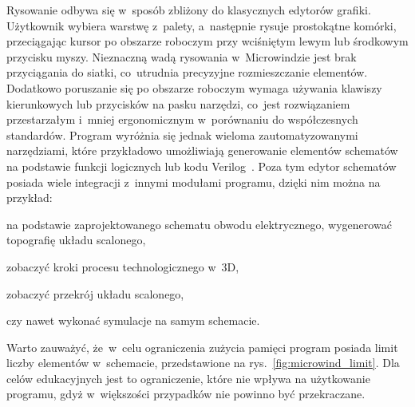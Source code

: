 \indent Rysowanie odbywa się w~sposób zbliżony do klasycznych edytorów grafiki.
Użytkownik wybiera warstwę z~palety,
a~następnie rysuje prostokątne komórki,
przeciągając kursor po obszarze roboczym przy wciśniętym lewym lub środkowym przycisku myszy. 
Nieznaczną wadą rysowania w~Microwindzie jest brak przyciągania do siatki,
co~utrudnia precyzyjne rozmieszczanie elementów.
Dodatkowo poruszanie się po obszarze roboczym wymaga używania klawiszy kierunkowych lub przycisków na pasku narzędzi,
co~jest rozwiązaniem przestarzałym i~mniej ergonomicznym w~porównaniu do współczesnych standardów.
Program wyróżnia się jednak wieloma zautomatyzowanymi narzędziami,
które przykładowo umożliwiają generowanie elementów schematów na podstawie funkcji logicznych lub kodu Verilog~\cite{microwind_operation_commands}. 
Poza tym edytor schematów posiada wiele integracji z~innymi modułami programu,
dzięki nim można na przykład:
\begin{citemize}
    \item na podstawie zaprojektowanego schematu obwodu elektrycznego, wygenerować topografię układu scalonego,
    \item zobaczyć kroki procesu technologicznego w~3D,
    \item zobaczyć przekrój układu scalonego,
    \item czy nawet wykonać symulacje na samym schemacie.
\end{citemize}
Warto zauważyć, że~w~celu ograniczenia zużycia pamięci program posiada limit liczby elementów w~schemacie,
przedstawione na rys.~\ref{fig:microwind_limit}.
Dla celów edukacyjnych jest to ograniczenie, które nie wpływa na użytkowanie programu,
gdyż w~większości przypadków nie powinno być przekraczane.

